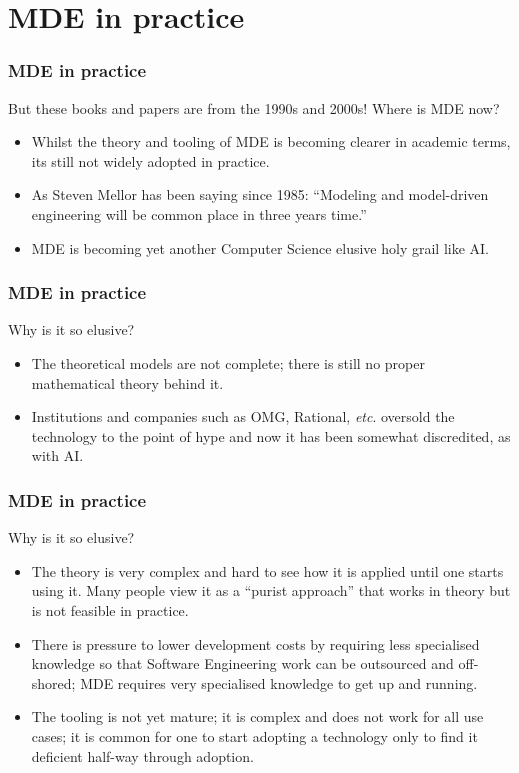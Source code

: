 \documentclass{beamer}
\newcommand{\etc}{\textit{etc}. }
\begin{document}
\section{MDE in practice}
\begin{frame}
\frametitle{MDE in practice}

But these books and papers are from the 1990s and 2000s! Where is MDE
now?
\pause

\begin{itemize}
\item Whilst the theory and tooling of MDE is becoming clearer in academic
  terms, its still not widely adopted in practice.
  \pause
\item As Steven Mellor has been saying since 1985: ``Modeling and
  model-driven engineering will be common place in three years time.''
  \pause
\item MDE is becoming yet another Computer Science elusive holy grail
  like AI.
\end{itemize}

\end{frame}

\begin{frame}
  \frametitle{MDE in practice}

Why is it so elusive?
\pause

\begin{itemize}
\item The theoretical models are not complete; there is still no
  proper mathematical theory behind it.
  \pause
\item Institutions and companies such as OMG, Rational, \etc oversold
  the technology to the point of hype and now it has been somewhat
  discredited, as with AI.
\end{itemize}

\end{frame}

\begin{frame}
  \frametitle{MDE in practice}

Why is it so elusive?

\begin{itemize}
\item The theory is very complex and hard to see how it is applied
  until one starts using it. Many people view it as a ``purist
  approach'' that works in theory but is not feasible in practice.
  \pause
\item There is pressure to lower development costs by requiring less
  specialised knowledge so that Software Engineering work can be
  outsourced and off-shored; MDE requires very specialised knowledge
  to get up and running.
  \pause
\item The tooling is not yet mature; it is complex and does not work
  for all use cases; it is common for one to start adopting a
  technology only to find it deficient half-way through adoption.
\end{itemize}

\end{frame}
\end{document}
